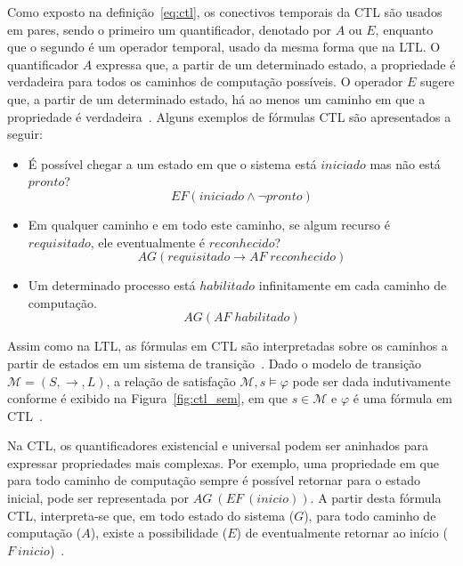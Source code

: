 Como exposto na definição~\ref{eq:ctl}, os conectivos temporais da CTL são usados em pares, sendo o primeiro um quantificador, denotado por $A$ ou $E$, enquanto que o segundo é um operador temporal, usado da mesma forma que na LTL. O quantificador $A$ expressa que, a partir de um determinado estado, a propriedade é verdadeira para todos os caminhos de computação possíveis. O operador $E$ sugere que, a partir de um determinado estado, há ao menos um caminho em que a propriedade é verdadeira~\cite{katoen1999concepts}. Alguns exemplos de fórmulas CTL são apresentados a seguir: 
\begin{itemize}
	\item É possível chegar a um estado em que o sistema está $iniciado$ mas não está $pronto$? 
	\begin{equation}
	EF(iniciado \wedge \neg pronto)
	\end{equation}
	\item Em qualquer caminho e em todo este caminho, se algum recurso é $requisitado$, ele eventualmente é $reconhecido$? 
	\begin{equation}
	AG(requisitado \to AF\;reconhecido)
	\end{equation}
	\item Um determinado processo está $habilitado$ infinitamente em cada caminho de computação. 
	\begin{equation}
	AG(AF\;habilitado)
	\end{equation}
\end{itemize}

Assim como na LTL, as fórmulas em CTL são interpretadas sobre os caminhos a partir de estados em um sistema de transição~\cite{katoen1999concepts}. Dado o modelo de transição $\mathcal{M} = (S, \rightarrow, L)$, a relação de satisfação $\mathcal{M}, s \models \varphi$ pode ser dada indutivamente conforme é exibido na Figura~\ref{fig:ctl_sem}, em que $s \in \mathcal{M}$ e $\varphi$ é uma fórmula em CTL~\cite{mura2016}.

Na CTL, os quantificadores existencial e universal podem ser aninhados para expressar propriedades mais complexas. Por exemplo, uma propriedade em que para todo caminho de computação sempre é possível retornar para o estado inicial, pode ser representada por $AG~(EF~(inicio))$. A partir desta fórmula CTL, interpreta-se que, em todo estado do sistema ($G$), para todo caminho de computação ($A$), existe a possibilidade ($E$) de eventualmente retornar ao início ($F~inicio$)~\cite{baier2008principles}.

